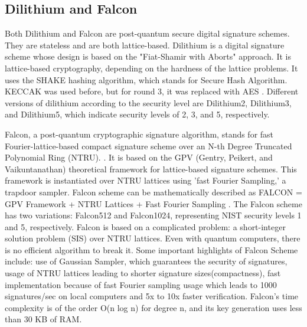 \subsection{Dilithium and Falcon}
Both Dilithium and Falcon are post-quantum secure digital signature schemes.
They are stateless and are both lattice-based.
 Dilithium is a digital signature scheme whose design is based on the "Fiat-Shamir with Aborts" approach. 
It is lattice-based cryptography, depending on the hardness of the lattice problems.
It uses the SHAKE hashing algorithm, which stands for Secure Hash Algorithm. KECCAK was used before, but for round 3, it was replaced with AES \cite{raaviPerformanceCharacterizationPostQuantum2021}. 
Different versions of dilithium according to the security level are Dilithium2, Dilithium3, and Dilithium5, which indicate security levels of 2, 3, and 5, respectively.

Falcon, a post-quantum cryptographic signature algorithm, stands for fast Fourier-lattice-based compact signature scheme over an N-th Degree Truncated Polynomial Ring (NTRU).
\cite{fouqueFalconFastFourierLatticebaseda}. 
It is based on the GPV (Gentry, Peikert, and Vaikuntanathan) theoretical framework for lattice-based signature schemes. 
This framework is instantiated over NTRU lattices using 'fast Fourier Sampling,' a trapdoor sampler.
Falcon scheme can be mathematically described as FALCON = GPV Framework + NTRU Lattices +  Fast Fourier Sampling . 
The Falcon scheme has two variations: Falcon512 and Falcon1024, representing NIST security levels 1 and 5, respectively.
Falcon is based on a complicated problem: a short-integer solution problem (SIS) over NTRU lattices.
Even with quantum computers, there is no efficient algorithm to break it.
Some important highlights of Falcon Scheme include:
use of Gaussian Sampler, which guarantees the security of signatures, usage of NTRU lattices leading to shorter signature sizes(compactness), 
fast implementation because of fast Fourier sampling usage which leads to 1000 signatures/sec on local computers and 5x to 10x faster verification. 
Falcon's time complexity is of the order O(n log n) for degree n, and its key generation uses less than 30 KB of RAM.

